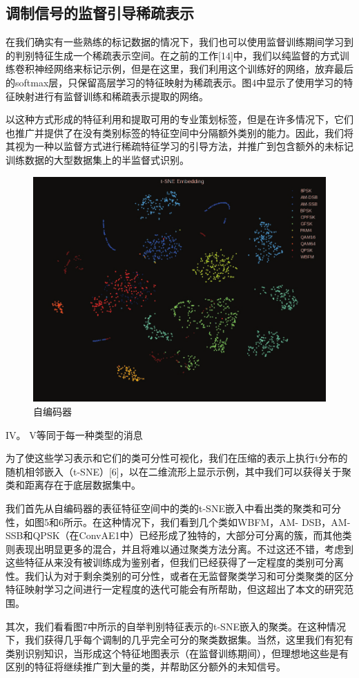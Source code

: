 \subsection{调制信号的监督引导稀疏表示}
在我们确实有一些熟练的标记数据的情况下，我们也可以使用监督训练期间学习到的判别特征生成一个稀疏表示空间。在之前的工作[14]中，我们以纯监督的方式训练卷积神经网络来标记示例，但是在这里，我们利用这个训练好的网络，放弃最后的softmax层，只保留高层学习的特征映射为稀疏表示。图4中显示了使用学习的特征映射进行有监督训练和稀疏表示提取的网络。\par
以这种方式形成的特征利用和提取可用的专业策划标签，但是在许多情况下，它们也推广并提供了在没有类别标签的特征空间中分隔额外类别的能力。因此，我们将其视为一种以监督方式进行稀疏特征学习的引导方法，并推广到包含额外的未标记训练数据的大型数据集上的半监督式识别。\par

\begin{figure}[!h]
	\centering
	\includegraphics[scale=0.2]{figures/chapter_3/surprised_fea}
	\caption{自编码器}	\label{fig_3_2}
\end{figure}

IV。 V等同于每一种类型的消息\par
为了使这些学习表示和它们的类可分性可视化，我们在压缩的表示上执行t分布的随机相邻嵌入（t-SNE）[6]，以在二维流形上显示示例，其中我们可以获得关于聚类和距离存在于底层数据集中。\par
我们首先从自编码器的表征特征空间中的类的t-SNE嵌入中看出类的聚类和可分性，如图5和6所示。在这种情况下，我们看到几个类如WBFM，AM- DSB，AM-SSB和QPSK（在ConvAE1中）已经形成了独特的，大部分可分离的簇，而其他类则表现出明显更多的混合，并且将难以通过聚类方法分离。不过这还不错，考虑到这些特征从来没有被训练成为鉴别者，但我们已经获得了一定程度的类别可分离性。我们认为对于剩余类别的可分性，或者在无监督聚类学习和可分类聚类的区分特征映射学习之间进行一定程度的迭代可能会有所帮助，但这超出了本文的研究范围。\par
其次，我们看看图7中所示的自举判别特征表示的t-SNE嵌入的聚类。在这种情况下，我们获得几乎每个调制的几乎完全可分的聚类数据集。当然，这里我们有犯有类别识别知识，当形成这个特征地图表示（在监督训练期间），但理想地这些是有区别的特征将继续推广到大量的类，并帮助区分额外的未知信号。\par


